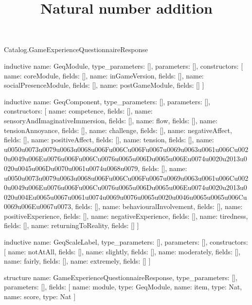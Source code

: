 \begin{lexlean}{Catalog.GameExperienceQuestionnaireResponse}
\title{Natural number addition}
\begin{semanticmodule}
inductive{
  name: GeqModule,
  type_parameters: [],
  parameters: [],
  constructors: [
    {name: coreModule, fields: []},
    {name: inGameVersion, fields: []},
    {name: socialPresenceModule, fields: []},
    {name: postGameModule, fields: []}
  ]
}

inductive{
  name: GeqComponent,
  type_parameters: [],
  parameters: [],
  constructors: [
    {name: competence, fields: []},
    {name: sensoryAndImaginativeImmersion, fields: []},
    {name: flow, fields: []},
    {name: tensionAnnoyance, fields: []},
    {name: challenge, fields: []},
    {name: negativeAffect, fields: []},
    {name: positiveAffect, fields: []},
    {name: tension, fields: []},
    {name: u0050u0073u0079u0063u0068u006Fu006Cu006Fu0067u0069u0063u0061u006Cu0020u0049u006Eu0076u006Fu006Cu0076u0065u006Du0065u006Eu0074u0020u2013u0020u0045u006Du0070u0061u0074u0068u0079, fields: []},
    {name: u0050u0073u0079u0063u0068u006Fu006Cu006Fu0067u0069u0063u0061u006Cu0020u0049u006Eu0076u006Fu006Cu0076u0065u006Du0065u006Eu0074u0020u2013u0020u004Eu0065u0067u0061u0074u0069u0076u0065u0020u0046u0065u0065u006Cu0069u006Eu0067u0073, fields: []},
    {name: behaviouralInvolvement, fields: []},
    {name: positiveExperience, fields: []},
    {name: negativeExperience, fields: []},
    {name: tiredness, fields: []},
    {name: returningToReality, fields: []}
  ]
}

inductive{
  name: GeqScaleLabel,
  type_parameters: [],
  parameters: [],
  constructors: [
    {name: notAtAll, fields: []},
    {name: slightly, fields: []},
    {name: moderately, fields: []},
    {name: fairly, fields: []},
    {name: extremely, fields: []}
  ]
}

structure{
  name: GameExperienceQuestionnaireResponse,
  type_parameters: [],
  parameters: [],
  fields: [
    {name: module, type: GeqModule},
    {name: item, type: Nat},
    {name: score, type: Nat}
  ]
}
\end{semanticmodule}
\end{lexlean}
